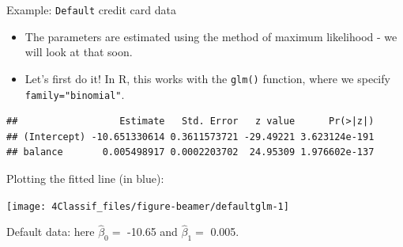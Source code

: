 \documentclass[10pt,ignorenonframetext,]{beamer}
\newenvironment{Shaded}{\begin{snugshade}}{\end{snugshade}}
\newcommand{\KeywordTok}[1]{\textcolor[rgb]{0.13,0.29,0.53}{\textbf{#1}}}
\newcommand{\DataTypeTok}[1]{\textcolor[rgb]{0.13,0.29,0.53}{#1}}
\newcommand{\DecValTok}[1]{\textcolor[rgb]{0.00,0.00,0.81}{#1}}
\newcommand{\StringTok}[1]{\textcolor[rgb]{0.31,0.60,0.02}{#1}}
\newcommand{\OperatorTok}[1]{\textcolor[rgb]{0.81,0.36,0.00}{\textbf{#1}}}
\newcommand{\NormalTok}[1]{#1}
\begin{document}
\begin{frame}[fragile]

\begin{block}{Example: \texttt{Default} credit card data}

\vspace{2mm}

\begin{itemize}
\item
  The parameters are estimated using the method of maximum likelihood -
  we will look at that soon.
\item
  Let's first do it! In R, this works with the \texttt{glm()} function,
  where we specify \texttt{family="binomial"}.
\end{itemize}

\vspace{2mm}

\scriptsize

\begin{Shaded}
\end{Shaded}

\begin{verbatim}
##                  Estimate   Std. Error   z value      Pr(>|z|)
## (Intercept) -10.651330614 0.3611573721 -29.49221 3.623124e-191
## balance       0.005498917 0.0002203702  24.95309 1.976602e-137
\end{verbatim}

\end{block}

\end{frame}

\begin{frame}

Plotting the fitted line (in blue):

\begin{center}\texttt{[image: 4Classif\_files/figure-beamer/defaultglm-1]} \end{center}

Default data: here \(\hat{\beta}_0=\) -10.65 and \(\hat{\beta}_1=\)
0.005.

\end{frame}
\end{document}
